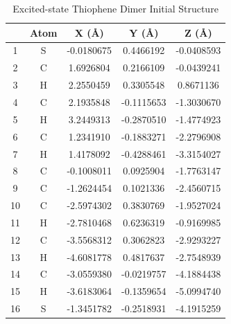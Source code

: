 \begin{table}[hbt!]\centering
\caption{Excited-state Thiophene Dimer Initial Structure}
\renewcommand{\arraystretch}{1.5}
\begin{threeparttable}
\begin{tabular}{ccccc}\toprule
{} & {Atom} & {X (\AA)} & {Y (\AA)} & {Z (\AA)} \\ \midrule
  1 & S & -0.0180675 & 0.4466192 & -0.0408593\\
  2 & C & 1.6926804 & 0.2166109 & -0.0439241\\
  3 & H & 2.2550459 & 0.3305548 & 0.8671136\\
  4 & C & 2.1935848 & -0.1115653 & -1.3030670\\ \midrule
  5 & H & 3.2449313 & -0.2870510 & -1.4774923\\
  6 & C & 1.2341910 & -0.1883271 & -2.2796908\\
  7 & H & 1.4178092 & -0.4288461 & -3.3154027\\
  8 & C & -0.1008011 & 0.0925904 & -1.7763147\\ \midrule
  9 & C & -1.2624454 & 0.1021336 & -2.4560715\\
  10 & C & -2.5974302 & 0.3830769 & -1.9527024\\
  11 & H & -2.7810468 & 0.6236319 & -0.9169985\\
  12 & C & -3.5568312 & 0.3062823 & -2.9293227\\ \midrule
  13 & H & -4.6081778 & 0.4817637 & -2.7548939\\
  14 & C & -3.0559380 & -0.0219757 & -4.1884438\\
  15 & H & -3.6183064 & -0.1359654 & -5.0994740\\
  16 & S & -1.3451782 & -0.2518931 & -4.1915259\\ \bottomrule
\end{tabular}
\begin{tablenotes}
\item
\end{tablenotes}
\end{threeparttable}
\end{table}

